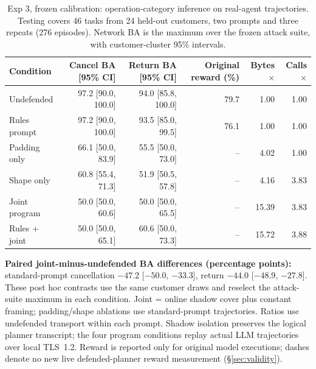 \begin{table}[t]\centering\small
\caption{Exp 3, frozen calibration: operation-category inference on real-agent trajectories. Testing covers 46 tasks from 24 held-out customers, two prompts and three repeats (276 episodes). Network BA is the maximum over the frozen attack suite, with customer-cluster 95\% intervals.}\label{tab:r4-primary}
\begin{tabular}{@{}lrrrrr@{}}\toprule
Condition & Cancel BA [95\% CI] & Return BA [95\% CI] & Original reward (\%) & Bytes$\times$ & Calls$\times$\\\midrule
Undefended & 97.2 [90.0, 100.0] & 94.0 [85.8, 100.0] & 79.7 & 1.00 & 1.00\\
Rules prompt & 97.2 [90.0, 100.0] & 93.5 [85.0, 99.5] & 76.1 & 1.00 & 1.00\\
Padding only & 66.1 [50.0, 83.9] & 55.5 [50.0, 73.0] & -- & 4.02 & 1.00\\
Shape only & 60.8 [55.4, 71.3] & 51.9 [50.5, 57.8] & -- & 4.16 & 3.83\\
Joint program & 50.0 [50.0, 60.6] & 50.0 [50.0, 65.5] & -- & 15.39 & 3.83\\
Rules + joint & 50.0 [50.0, 65.1] & 60.6 [50.0, 73.3] & -- & 15.72 & 3.88\\
\bottomrule\end{tabular}
\par\smallskip\raggedright \textbf{Paired joint-minus-undefended BA differences (percentage points):} standard-prompt cancellation $-47.2$ [$-50.0$, $-33.3$], return $-44.0$ [$-48.9$, $-27.8$]. These post hoc contrasts use the same customer draws and reselect the attack-suite maximum in each condition. Joint = online shadow cover plus constant framing; padding/shape ablations use standard-prompt trajectories. Ratios use undefended transport within each prompt. Shadow isolation preserves the logical planner transcript; the four program conditions replay actual LLM trajectories over local TLS~1.2. Reward is reported only for original model executions; dashes denote no new live defended-planner reward measurement (\S\ref{sec:validity}).
\end{table}
